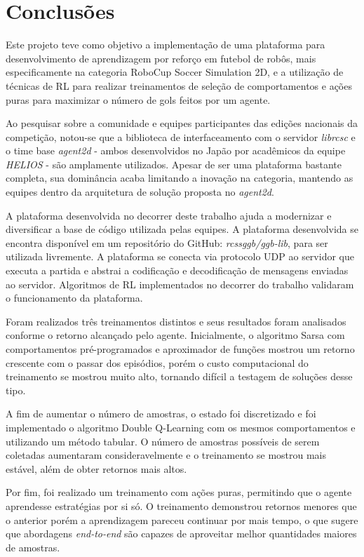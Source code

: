 
\chapter{Conclusões}
\label{chap:Conclusoes}

Este projeto teve como objetivo a implementação de uma plataforma para desenvolvimento de aprendizagem por reforço em futebol de robôs, mais especificamente na categoria RoboCup Soccer Simulation 2D, e a utilização de técnicas de RL para realizar treinamentos de seleção de comportamentos e ações puras para maximizar o número de gols feitos por um agente.

Ao pesquisar sobre a comunidade e equipes participantes das edições nacionais da competição, notou-se que a biblioteca de interfaceamento com o servidor \textit{librcsc} e o time base \textit{agent2d} - ambos desenvolvidos no Japão por acadêmicos da equipe \textit{HELIOS} - são amplamente utilizados. Apesar de ser uma plataforma bastante completa, sua dominância acaba limitando a inovação na categoria, mantendo as equipes dentro da arquitetura de solução proposta no \textit{agent2d}.

A plataforma desenvolvida no decorrer deste trabalho ajuda a modernizar e diversificar a base de código utilizada pelas equipes. A plataforma desenvolvida se encontra disponível em um repositório do GitHub: \textit{rcssggb/ggb-lib}, para ser utilizada livremente. A plataforma se conecta via protocolo UDP ao servidor que executa a partida e abstrai a codificação e decodificação de mensagens enviadas ao servidor. Algoritmos de RL implementados no decorrer do trabalho validaram o funcionamento da plataforma.

Foram realizados três treinamentos distintos e seus resultados foram analisados conforme o retorno alcançado pelo agente. Inicialmente, o algoritmo Sarsa com comportamentos pré-programados e aproximador de funções mostrou um retorno crescente com o passar dos episódios, porém o custo computacional do treinamento se mostrou muito alto, tornando difícil a testagem de soluções desse tipo.

A fim de aumentar o número de amostras, o estado foi discretizado e foi implementado o algoritmo Double Q-Learning com os mesmos comportamentos e utilizando um método tabular. O número de amostras possíveis de serem coletadas aumentaram consideravelmente e o treinamento se mostrou mais estável, além de obter retornos mais altos.

Por fim, foi realizado um treinamento com ações puras, permitindo que o agente aprendesse estratégias por si só. O treinamento demonstrou retornos menores que o anterior porém a aprendizagem pareceu continuar por mais tempo, o que sugere que abordagens \textit{end-to-end} são capazes de aproveitar melhor quantidades maiores de amostras.

